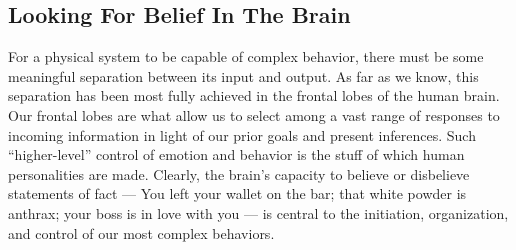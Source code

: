 \documentclass[a4paper,14pt]{extbook}
\begin{document}
\subsection{Looking For Belief In The Brain}

For a physical system to be capable of complex behavior, there must be some meaningful separation between its input and output.
As far as we know, this separation has been most fully achieved in the frontal lobes of the human brain.
Our frontal lobes are what allow us to select among a vast range of responses to incoming information in light of our prior goals and present inferences.
Such ``higher-level'' control of emotion and behavior is the stuff of which human personalities are made.
Clearly, the brain’s capacity to believe or disbelieve statements of fact --- You left your wallet on the bar;
that white powder is anthrax;
your boss is in love with you --- is central to the initiation, organization, and control of our most complex behaviors.
\end{document}
